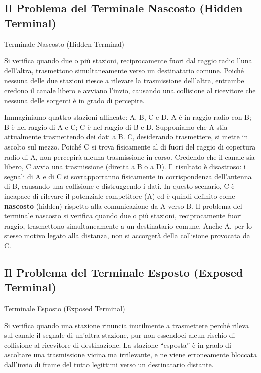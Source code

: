 \documentclass[
  italian,
  openany]{book}
\begin{document}
\subsection{Il Problema del Terminale Nascosto (Hidden
Terminal)}\label{il-problema-del-terminale-nascosto-hidden-terminal}

\begin{calloutdefinition}{Terminale Nascosto (Hidden Terminal)}

Si verifica quando due o più stazioni, reciprocamente fuori dal raggio
radio l'una dell'altra, trasmettono simultaneamente verso un
destinatario comune. Poiché nessuna delle due stazioni riesce a rilevare
la trasmissione dell'altra, entrambe credono il canale libero e avviano
l'invio, causando una collisione al ricevitore che nessuna delle
sorgenti è in grado di percepire.

\end{calloutdefinition}

Immaginiamo quattro stazioni allineate: A, B, C e D. A è in raggio radio
con B; B è nel raggio di A e C; C è nel raggio di B e D. Supponiamo che
A stia attualmente trasmettendo dei dati a B. C, desiderando
trasmettere, si mette in ascolto sul mezzo. Poiché C si trova
fisicamente al di fuori del raggio di copertura radio di A, non
percepirà alcuna trasmissione in corso. Credendo che il canale sia
libero, C avvia una trasmissione (diretta a B o a D). Il risultato è
disastroso: i segnali di A e di C si sovrapporranno fisicamente in
corrispondenza dell'antenna di B, causando una collisione e distruggendo
i dati. In questo scenario, C è incapace di rilevare il potenziale
competitore (A) ed è quindi definito come \textbf{nascosto} (hidden)
rispetto alla comunicazione da A verso B. Il problema del terminale
nascosto si verifica quando due o più stazioni, reciprocamente fuori
raggio, trasmettono simultaneamente a un destinatario comune. Anche A,
per lo stesso motivo legato alla distanza, non si accorgerà della
collisione provocata da C.

\subsection{Il Problema del Terminale Esposto (Exposed
Terminal)}\label{il-problema-del-terminale-esposto-exposed-terminal}

\begin{calloutdefinition}{Terminale Esposto (Exposed Terminal)}

Si verifica quando una stazione rinuncia inutilmente a trasmettere
perché rileva sul canale il segnale di un'altra stazione, pur non
essendoci alcun rischio di collisione al ricevitore di destinazione. La
stazione ``esposta'' è in grado di ascoltare una trasmissione vicina ma
irrilevante, e ne viene erroneamente bloccata dall'invio di frame del
tutto legittimi verso un destinatario distante.

\end{calloutdefinition}
\end{document}
